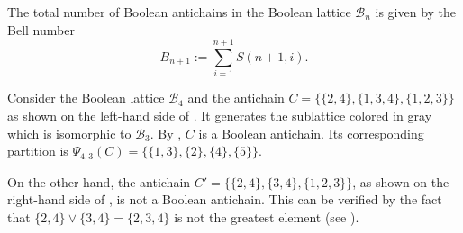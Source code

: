 \documentclass{preprint}
\newcommand{\cB}{\mathcal{B}}
\theoremstyle{definition}
\begin{document}
\begin{corollary}\label{Total number of Boolean antichains is Bell number}
    The total number of Boolean antichains in the Boolean lattice $\cB_n$ is given by the Bell number \cite{bell1934exponential}
    $$B_{n+1} := \sum_{i=1}^{n+1} S(n+1,i).$$
\end{corollary}

\begin{example}
    Consider the Boolean lattice $\cB_4$ and the antichain $C=\{\{2,4\},\{1,3,4\},\{1,2,3\}\}$ as shown on the left-hand side of . It generates the sublattice colored in gray which is isomorphic to $\cB_3$. By , $C$ is a Boolean antichain. Its corresponding partition is $\Psi_{4,3}(C)=\{\{1,3\},\{2\},\{4\},\{5\}\}$. 
    
    On the other hand, the antichain $C'=\{\{2,4\},\{3,4\},\{1,2,3\}\}$, as shown on the right-hand side of , is not a Boolean antichain. This can be verified by the fact that $\{2,4\}\vee\{3,4\} = \{2,3,4\}$ is not the greatest element (see ).
\end{example}
\end{document}

